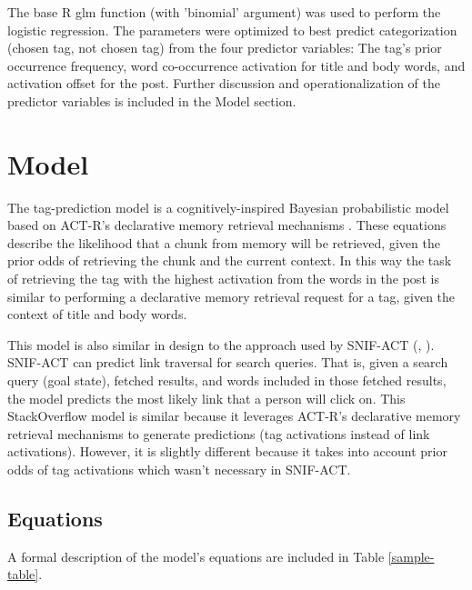 \documentclass[10pt,letterpaper]{article}
\begin{document}
The base R glm function (with 'binomial' argument) was used to perform the logistic regression.
The parameters were optimized to best predict categorization (chosen tag, not chosen tag) from the four predictor variables:
The tag's prior occurrence frequency, word co-occurrence activation for title and body words, and activation offset for the post.
Further discussion and operationalization of the predictor variables is included in the Model section.

\section{Model}

The tag-prediction model is a cognitively-inspired Bayesian probabilistic model based on ACT-R's declarative memory retrieval mechanisms \cite{Anderson2004}.
These equations describe the likelihood that a chunk from memory will be retrieved, given the prior odds of retrieving the chunk and the current context.
In this way the task of retrieving the tag with the highest activation from the words in the post is similar to performing a declarative memory retrieval request for a tag, given the context of title and body words.

This model is also similar in design to the approach used by SNIF-ACT (, ). 
SNIF-ACT can predict link traversal for search queries.
That is, given a search query (goal state), fetched results, and words included in those fetched results, the model predicts the most likely link that a person will click on.
This StackOverflow model is similar because it leverages ACT-R's declarative memory retrieval mechanisms to generate predictions (tag activations instead of link activations).
However, it is slightly different because it takes into account prior odds of tag activations which wasn't necessary in SNIF-ACT.

\subsection{Equations}

A formal description of the model's equations are included in Table \ref{sample-table}. 
\end{document}
